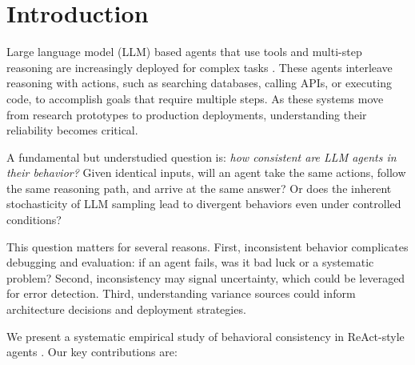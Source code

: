 \documentclass{article}
\begin{document}
\section{Introduction}
\label{sec:intro}

Large language model (LLM) based agents that use tools and multi-step reasoning are increasingly deployed for complex tasks \citep{yao2022react, schick2023toolformer}. These agents interleave reasoning with actions, such as searching databases, calling APIs, or executing code, to accomplish goals that require multiple steps. As these systems move from research prototypes to production deployments, understanding their reliability becomes critical.

A fundamental but understudied question is: \emph{how consistent are LLM agents in their behavior?} Given identical inputs, will an agent take the same actions, follow the same reasoning path, and arrive at the same answer? Or does the inherent stochasticity of LLM sampling lead to divergent behaviors even under controlled conditions?

This question matters for several reasons. First, inconsistent behavior complicates debugging and evaluation: if an agent fails, was it bad luck or a systematic problem? Second, inconsistency may signal uncertainty, which could be leveraged for error detection. Third, understanding variance sources could inform architecture decisions and deployment strategies.

We present a systematic empirical study of behavioral consistency in ReAct-style agents \citep{yao2022react}. Our key contributions are:
\end{document}
